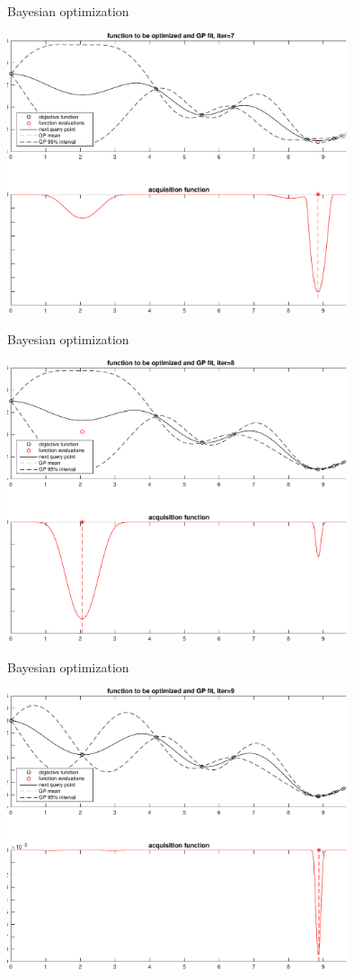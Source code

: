 \documentclass[t]{beamer}
\begin{document}
\begin{frame}
  
  {\Large\color{navyblue} Bayesian optimization}

    \includegraphics[width=10cm]{bayesopt_1d_regular_iter7-crop.pdf}

\end{frame}
\begin{frame}
  
  {\Large\color{navyblue} Bayesian optimization}

    \includegraphics[width=10cm]{bayesopt_1d_regular_iter8-crop.pdf}

\end{frame}
\begin{frame}
  
  {\Large\color{navyblue} Bayesian optimization}

    \includegraphics[width=10cm]{bayesopt_1d_regular_iter9-crop.pdf}

\end{frame}
\end{document}
